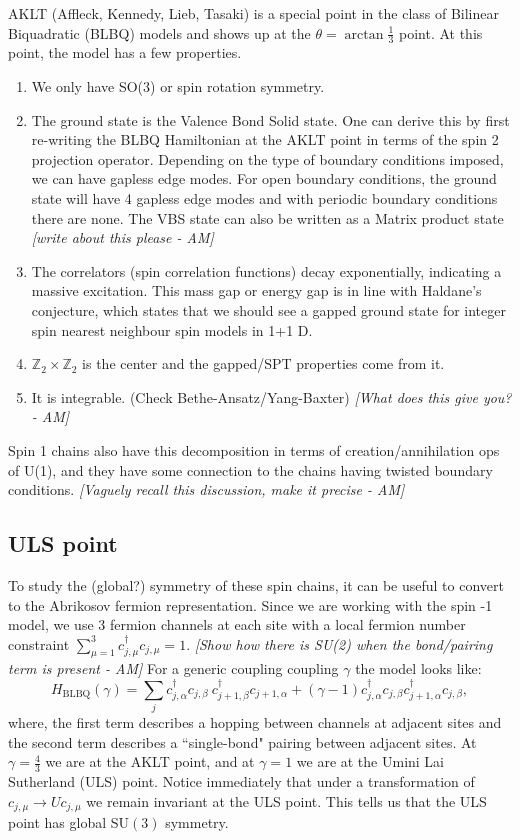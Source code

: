 \documentclass{article}
\newcommand\AM[1]{{\it \color{darkblue}  [#1 - AM]}}
\begin{document}
AKLT (Affleck, Kennedy, Lieb, Tasaki) is a special point in the class of Bilinear Biquadratic (BLBQ) models and shows up at the $\theta = \arctan{\frac{1}{3}}$ point. At this point, the model has a few properties.
\begin{enumerate}
    \item We only have SO(3) or spin rotation symmetry. 
    \item The ground state is the Valence Bond Solid state. One can derive this by first re-writing the BLBQ Hamiltonian at the AKLT point in terms of the spin 2 projection operator. Depending on the type of boundary conditions imposed, we can have gapless edge modes. For open boundary conditions, the ground state will have 4 gapless edge modes and with periodic boundary conditions there are none. The VBS state can also be written as a Matrix product state \AM{write about this please}
    \item The correlators (spin correlation functions) decay exponentially, indicating a massive excitation. This mass gap or energy gap is in line with Haldane's conjecture, which states that we should see a gapped ground state for integer spin nearest neighbour spin models in 1+1 D.
    \item $\mathbb{Z}_2 \times \mathbb{Z}_2$ is the center and the gapped/SPT properties come from it.
    \item  It is integrable. (Check Bethe-Ansatz/Yang-Baxter) \AM{What does this give you?}
\end{enumerate}

Spin 1 chains also have this decomposition in terms of creation/annihilation ops of U(1), and they have some connection to the chains having twisted boundary conditions.\AM{Vaguely recall this discussion, make it precise}
\subsection{ULS point}
To study the (global?) symmetry of these spin chains, it can be useful to convert to the Abrikosov fermion representation. Since we are working with the spin -1 model, we use 3 fermion channels at each site with a local fermion number constraint $\sum^{3}_{\mu = 1} c^{\dagger}_{j, \mu} c_{j, \mu} = 1.$ \AM{Show how there is SU(2) when the bond/pairing term is present}
For a generic coupling coupling $\gamma$ the model looks like:
\begin{equation}
    H_{\text{BLBQ}}(\gamma) = \sum_{j} c^{\dagger}_{j, \alpha} c_{j, \beta} ~c^{\dagger}_{j+1, \beta}c_{j+1, \alpha} + (\gamma -1)  c^{\dagger}_{j, \alpha} c_{j, \beta} c^{\dagger}_{j+1, \alpha} c_{j, \beta},
\end{equation}
where, the first term describes a hopping between channels at adjacent sites and the second term describes a ``single-bond" pairing between adjacent sites.
 At $\gamma = \frac{4}{3}$ we are at the AKLT point, and at $\gamma = 1$ we are at the Umini Lai Sutherland (ULS) point. Notice immediately that under a transformation of $c_{j, \mu} \to Uc_{j, \mu}$ we remain invariant at the ULS point. This tells us that the ULS point has global SU$(3)$ symmetry.
\end{document}

